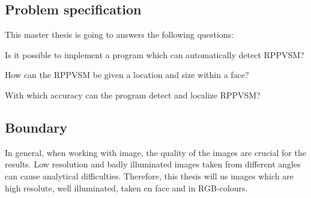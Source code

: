 \subsection{Problem specification}
This master thesis is going to answers the following questions: 
\begin{displayquote}
	Is it possible to implement a program which can automatically detect RPPVSM?

	How can the RPPVSM be given a location and size within a face?

	With which accuracy can the program detect and localize RPPVSM?
\end{displayquote}



\subsection{Boundary}

In general, when working with image, the quality of the images are crucial for the results. Low resolution and badly illuminated images taken from different angles can cause analytical difficulties. Therefore, this thesis will us images which are high resolute, well illuminated, taken en face and in RGB-colours. 
